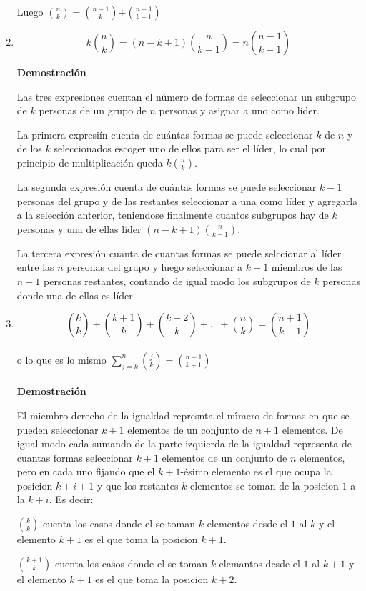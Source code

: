 \documentclass[a4paper,12pt]{report}
\begin{document}
\begin{enumerate}
 Luego ${n}\choose{k}$$=$${n-1}\choose{k}$$+$${n-1}\choose{k-1}$
 
 
 \item $$k\binom{n}{k}=(n-k+1)\binom{n}{k-1}=n\binom{n-1}{k-1}$$
 
 \textbf{Demostración}
 
 Las tres expresiones cuentan el n\'umero de formas de seleccionar un subgrupo de $k$ personas de un grupo de $n$ personas y asignar a uno como l\'ider.

 La primera expresi\'in cuenta de cu\'antas formas se puede seleccionar $k$ de $n$ y de los $k$ seleccionados escoger uno de ellos para ser el l\'ider, lo cual por principio de multiplicaci\'on queda $k$${n}\choose{k}$. 
 
 La segunda expresi\'on cuenta de cu\'antas formas se puede seleccionar $k-1$ personas del grupo y de las restantes seleccionar a una como l\'ider y agregarla a la selecci\'on anterior, teniendose finalmente cuantos subgrupos hay de $k$ personas y una de ellas l\'ider $(n-k+1)$${n}\choose{k-1}$.

 La tercera expresi\'on cuanta de cuantas formas se puede selccionar al l\'ider entre las $n$ personas del grupo y luego seleccionar a $k-1$ miembros de las $n-1$ personas restantes, contando de igual modo los subgrupos de $k$ personas donde una de ellas es l\'ider.

 \item $$\binom{k}{k}+\binom{k+1}{k}+\binom{k+2}{k}+\dots +\binom{n}{k}=\binom{n+1}{k+1}$$\\ 
 o lo que es lo mismo $\sum^n_{j=k}$${j}\choose{k}$$=$${n+1}\choose{k+1}$\\\\
 
 \textbf{Demostración}

 El miembro derecho de la igualdad represnta el n\'umero de formas en que se pueden seleccionar $k+1$ elementos de un conjunto de $n+1$ elementos. De igual modo 
 cada sumando de la parte izquierda de la igualdad representa de cuantas formas seleccionar $k+1$ elementos de un conjunto de $n$ elementos, pero en cada uno fijando que el $k+1$-\'esimo elemento es el que ocupa la posicion $k+i +1$ y que los restantes $k$ elementos se toman de la posicion $1$ a la $k+i$. 
 Es decir:
 
 ${k}\choose{k}$ cuenta los casos donde el se toman $k$ elementos desde el $1$ al $k$ y el elemento $k+1$ es el que toma la posicion $k+1$.

 ${k+1}\choose{k}$ cuenta los casos donde el se toman $k$ elemantos desde el $1$ al $k+1$ y el elemento $k+1$ es el que toma la posicion $k+2$.


\end{enumerate}
\end{document}
